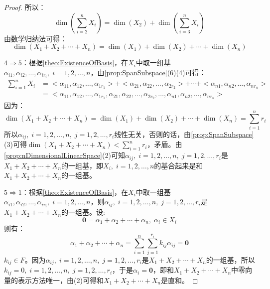 \begin{proof}
	所以：
	\begin{equation*}
		\dim\left(\sum_{i=2}^{n}X_i\right)
		=\dim(X_2)+\dim\left(\sum_{i=3}^{n}X_i\right)
	\end{equation*}
	由数学归纳法可得：
	\begin{equation*}
		\dim(X_1+X_2+\cdots+X_n)=\dim(X_1)+\dim(X_2)+\cdots+\dim(X_n)
	\end{equation*}\par
	$4\Rightarrow5$：根据\cref{theo:ExistenceOfBasis}，在$X_i$中取一组基$\alpha_{i1},\alpha_{i2},\dots,\alpha_{ir_i},\;i=1,2,\dots,n$，由\cref{prop:SpanSubspace}(6)(4)可得：
	\begin{align*}
		\sum_{i=1}^{n}X_i
		&=<\alpha_{11},\alpha_{12},\dots,\alpha_{1r_1}>+<\alpha_{21},\alpha_{22},\dots,\alpha_{2r_2}>+\cdots+<\alpha_{n1},\alpha_{n2},\dots,\alpha_{nr_n}> \\
		&=<\alpha_{11},\alpha_{12},\dots,\alpha_{1r_1},\alpha_{21},\alpha_{22},\dots,\alpha_{2r_2},\dots,\alpha_{n1},\alpha_{n2},\dots,\alpha_{nr_n}>
	\end{align*}
	因为：
	\begin{equation*}
		\dim(X_1+X_2+\cdots+X_n)=\dim(X_1)+\dim(X_2)+\cdots+\dim(X_n)=\sum_{i=1}^{n}r_i
	\end{equation*}
	所以$\alpha_{ij},\;i=1,2,\dots,n,\;j=1,2,\dots,r_i$线性无关，否则的话，由\cref{prop:SpanSubspace}(3)可得$\dim(X_1+X_2+\cdots+X_n)<\sum\limits_{i=1}^{n}r_i$，矛盾。由\cref{prop:nDimensionalLinearSpace}(2)可知$\alpha_{ij},\;i=1,2,\dots,n,\;j=1,2,\dots,r_i$是$X_1+X_2+\cdots+X_n$的一组基，即$X_i,\;i=1,2,\dots,n$的基合起来是和$X_1+X_2+\cdots+X_n$的一组基。\par
	$5\Rightarrow1$：根据\cref{theo:ExistenceOfBasis}，在$X_i$中取一组基$\alpha_{i1},\alpha_{i2},\dots,\alpha_{ir_i},\;i=1,2,\dots,n$，则$\alpha_{ij},\;i=1,2,\dots,n,\;j=1,2,\dots,r_i$是$X_1+X_2+\cdots+X_n$的一组基。设:
	\begin{equation*}
		\mathbf{0}=\alpha_1+\alpha_2+\cdots+\alpha_n,\;\alpha_i\in X_i
	\end{equation*}
	则有：
	\begin{equation*}
		\alpha_1+\alpha_2+\cdots+\alpha_n=\sum_{i=1}^{n}\sum_{j=1}^{r_i}k_{ij}\alpha_{ij}=\mathbf{0}
	\end{equation*}
	$k_{ij}\in F$。因为$\alpha_{ij},\;i=1,2,\dots,n,\;j=1,2,\dots,r_i$是$X_1+X_2+\cdots+X_n$的一组基，所以$k_{ij}=0,\;i=1,2,\dots,n,\;j=1,2,\dots,r_i$，于是$\alpha_i=\mathbf{0}$，即和$X_1+X_2+\cdots+X_n$中零向量的表示方法唯一，由(2)可得和$X_1+X_2+\cdots+X_n$是直和。
\end{proof}
